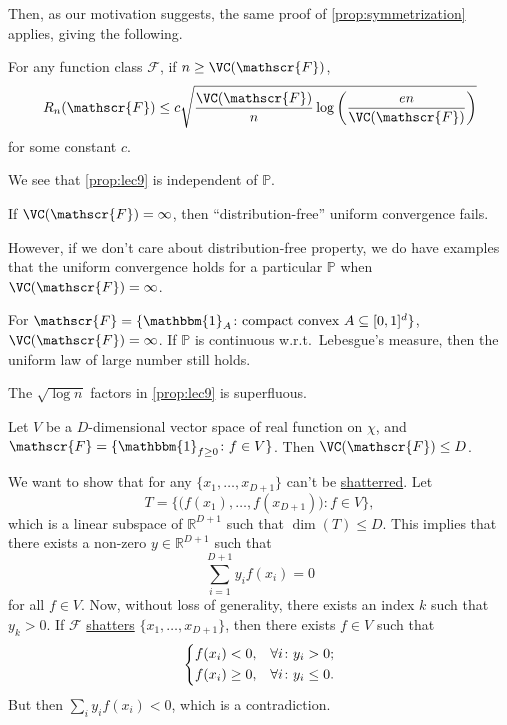 Then, as our motivation suggests, the same proof of \autoref{prop:symmetrization} applies, giving the following.

\begin{proposition}\label{prop:lec9}
  For any function class \(\mathscr{F} \), if \(n \geq \VC(\mathscr{F} ) \),
  \[
    R_n(\mathscr{F} ) \leq c \sqrt{\frac{\VC(\mathscr{F} ) }{n} \log \left( \frac{en}{\VC(\mathscr{F} ) } \right) }
  \]
  for some constant \(c\).
\end{proposition}

\begin{remark}
  We see that \autoref{prop:lec9} is independent of \(\mathbb{P} \).
\end{remark}

\begin{remark}
  If \(\VC(\mathscr{F} ) = \infty \), then ``distribution-free'' uniform convergence fails.
\end{remark}

However, if we don't care about distribution-free property, we do have examples that the uniform convergence holds for a particular \(\mathbb{P} \) when \(\VC(\mathscr{F} ) = \infty \).

\begin{eg}
  For \(\mathscr{F} = \{ \mathbbm{1}_{A} \colon \text{compact convex } A \subseteq [0, 1]^d \} \), \(\VC(\mathscr{F} ) = \infty \). If \(\mathbb{P} \) is continuous w.r.t.\ Lebesgue's measure, then the uniform law of large number still holds.
\end{eg}

\begin{remark}
  The \(\sqrt{\log n} \) factors in \autoref{prop:lec9} is superfluous.
\end{remark}

\begin{eg}
  Let \(V\) be a \(D\)-dimensional vector space of real function on \(\chi \), and \(\mathscr{F} = \{ \mathbbm{1}_{f\geq 0} \colon f \in V\} \). Then \(\VC(\mathscr{F} ) \leq D\).
\end{eg}
\begin{explanation}
  We want to show that for any \(\{ x_1, \dots , x_{D+1} \} \) can't be \hyperref[def:shatter]{shatterred}. Let
  \[
    T = \{ \big( f(x_1), \dots , f(x_{D+1}) \big) \colon f\in V \},
  \]
  which is a linear subspace of \(\mathbb{R} ^{D+1}\) such that \(\dim (T) \leq D\). This implies that there exists a non-zero \(y \in \mathbb{R} ^{D+1}\) such that
  \[
    \sum_{i=1}^{D+1} y_i f(x_i) = 0
  \]
  for all \(f\in V\). Now, without loss of generality, there exists an index \(k\) such that \(y_k > 0\). If \(\mathscr{F} \) \hyperref[def:shatter]{shatters} \(\{ x_1, \dots , x_{D+1} \} \), then there exists \(f\in V\) such that
  \[
    \begin{dcases}
      f(x_i) < 0,    & \forall i\colon y_i > 0  ;  \\
      f(x_i) \geq 0, & \forall i\colon y_i \leq 0.
    \end{dcases}
  \]
  But then \(\sum_{i} y_i f(x_i) < 0\), which is a contradiction.
\end{explanation}

